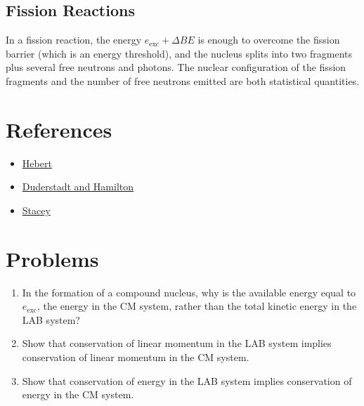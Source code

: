 \documentclass[11pt]{article}
\begin{document}
\subsection{Fission Reactions}
\label{sec:orgheadline8}
In a fission reaction, the energy \(e_{\text{exc}} + \Delta BE\) is enough to overcome the fission barrier (which is an energy threshold), and the nucleus splits into two fragments plus several free neutrons and photons.  The nuclear configuration of the fission fragments and the number of free neutrons emitted are both statistical quantities.  
\section{References}
\label{sec:orgheadline10}
\begin{itemize}
\item \href{Hebert2009}{Hebert}
\item \href{Duderstadt:Hamilton1976}{Duderstadt and Hamilton}
\item \href{Stacey2001}{Stacey}
\end{itemize}
\section{Problems}
\label{sec:orgheadline11}
\begin{enumerate}
\item In the formation of a compound nucleus, why is the available energy equal to \(e_\text{exc}\), the energy in the CM system, rather than the total kinetic energy in the LAB system?
\item Show that conservation of linear momentum in the LAB system implies conservation of linear momentum in the CM system.
\item Show that conservation of energy in the LAB system implies conservation of energy in the CM system.
\end{enumerate}
\end{document}

